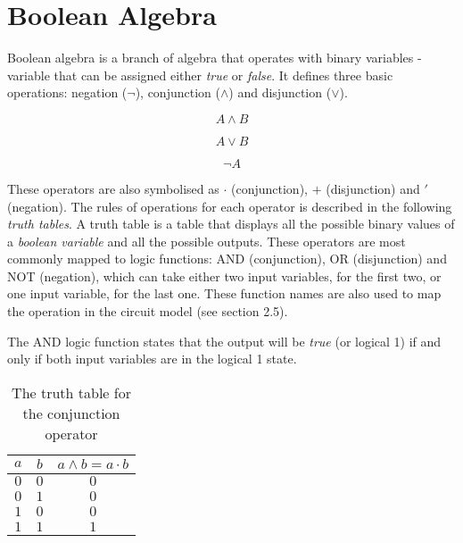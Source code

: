\section{Boolean Algebra}

Boolean algebra is a branch of algebra that operates with binary variables - variable that can be assigned
either \textit{true} or \textit{false}. It defines three basic operations: negation ($\lnot$), conjunction
($\land$) and disjunction ($\lor$).

\begin{equation}
    A \land B
\end{equation}

\begin{equation}
    A \lor B
\end{equation}

\begin{equation}
    \lnot A
\end{equation}

These operators are also symbolised as $\cdot$ (conjunction), $+$ (disjunction) and $'$ (negation). The
rules of operations for each operator is described in the following \textit{truth tables}. A truth
table is a table that displays all the possible binary values of a \textit{boolean variable}
and all the possible outputs. These operators are most commonly mapped to logic functions:
AND (conjunction), OR (disjunction) and NOT (negation), which can take either two input variables, for
the first two, or one input variable, for the last one. These function names are also used to map
the operation in the circuit model (see section 2.5).

The AND logic function states that the output will be \textit{true} (or logical 1) if and only if
both input variables are in the logical 1 state.
\begin{table}[ht]
    \centering
    \begin{tabular}{cc|c}
        $a$ & $b$ & $a \land b = a \cdot b$ \\
        \hline
        $0$ & $0$ & $0$ \\
        $0$ & $1$ & $0$ \\
        $1$ & $0$ & $0$ \\
        $1$ & $1$ & $1$ \\
    \end{tabular}
    \caption{The truth table for the conjunction operator}
\end{table}

